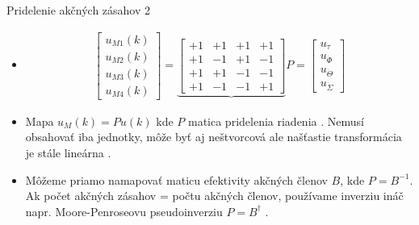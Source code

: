    \begin{frame}{Pridelenie akčných zásahov 2}
  \begin{itemize}
  \item<1->
        \begin{align}
     \begin{bmatrix}
       u_{M1}(k) \\
       u_{M2}(k) \\
       u_{M3}(k) \\
       u_{M4}(k)
     \end{bmatrix}=\underbrace{\begin{bmatrix}
                     +1 & +1 & +1 & +1 \\
                     +1 & -1 & +1 & -1 \\
                     +1 & +1 & -1 & -1 \\
                     +1 & -1 & -1 & +1
                   \end{bmatrix}}P =
                \begin{bmatrix}
                     u_{\tau} \\
       u_{\dot{\Phi}} \\
       u_{\dot{\Theta}} \\
       u_{\dot{\Sigma}}
     \end{bmatrix}
     \end{align}
     
    \item<2-> Mapa $u_M(k)=Pu(k)$ kde $P$ matica pridelenia riadenia . Nemusí obsahovať iba jednotky, môže byť aj neštvorcová ale našťastie transformácia je stále lineárna \citep{Bresciani2020}.
    \item<3-> Môžeme priamo namapovať maticu efektivity akčných členov  $B$, kde $P=B^{-1}$. Ak počet akčných zásahov = počtu akčných členov, používame inverziu ináč napr. Moore-Penroseovu pseudoinverziu $P=B^{\dagger}$ \citep{Bresciani2020}.
\end{itemize}
  \end{frame}



